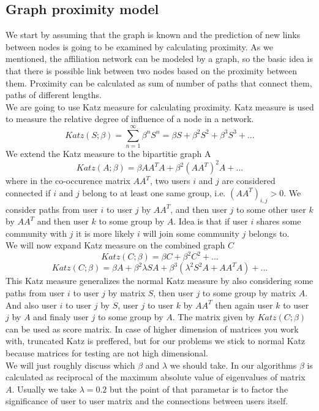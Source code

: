 \documentclass[twoside,twocolumn]{article}
\begin{document}
\subsection{Graph proximity model}
We start by assuming that the graph is known and the prediction of new links between nodes is going to be examined by calculating proximity. As we mentioned, the affiliation network can be modeled by a graph, so the basic idea is that there is possible link between two nodes based on the proximity between them. Proximity can be calculated as sum of number of paths  that connect them, paths of different lengths. \\
We are going to use Katz measure for calculating proximity. Katz measure is used to measure the relative degree of influence of a node in a network.
\[ Katz(S;\beta) = \sum_{n=1}^{\infty} \beta^n S^n = \beta S +\beta^2 S^2 + \beta^3 S^3 + ...  \]
We extend the Katz measure to the bipartitie graph A
\[ Katz(A;\beta) = \beta A A^T A +\beta^2 (AA^T)^2 A + ...  \]
where in the co-occurence matrix $A A^T$, two users $i$ and $j$ are considered connected if $i$ and $j$ belong to at least one same group, i.e. $(AA^T)_{i,j} > 0$. We consider paths from user $i$ to user $j$ by $AA^T$, and then user $j$ to some other user $k$ by $AA^T$ and then user $k$ to some group by $A$. Idea is that if user $i$ shares some community with $j$ it is more likely $i$ will join some community $j$ belongs to. \\
We will now expand Katz measure on the combined graph $C$
\[ Katz(C;\beta) = \beta C +\beta^2 C^2 + ...  \]
\[ Katz(C;\beta) = \beta A +\beta^2 \lambda S A +  \beta^3( \lambda^2 S^2A + A A^T A ) + ...  \]
This Katz measure generalizes the normal Katz measure by also considering some paths from user $i$ to user $j$ by matrix $S$, then user $j$ to some group by matrix $A$. And also user $i$ to user $j$ by $S$, user $j$ to user $k$ by $AA^T$ then again user $k$ to user $j$ by $A$ and finaly user $j$ to some group by $A$. The matrix given by $Katz(C;\beta)$ can be used as score matrix.
In case of higher dimension of matrices you work with, truncated Katz is preffered, but for our problems we stick to normal Katz because matrices for testing are not high dimensional. \\
We will just roughly discuss which $\beta$ and $\lambda$ we should take. In our algorithms $\beta$ is calculated as reciprocal of the maximum absolute value of eigenvalues of matrix $A$. Usually we take $\lambda = 0.2$ but the point of that parametar is to factor the significance of user to user matrix and the connections between users itself. 
\end{document}
